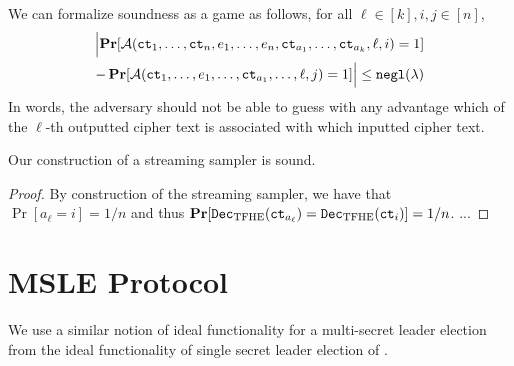We can formalize soundness as a game as follows, for all $\ell \in [k], i, j \in [n]$,
\begin{align}
	\Bigl\lvert 
		\operatorname*{\mathbf{Pr}}[\mathcal{A}(\texttt{ct}_1, \dots, \texttt{ct}_n, e_1, \dots, e_n, \texttt{ct}_{a_1}, \dots, \texttt{ct}_{a_k}, \ell, i) = 1] \\
		 - \operatorname*{\mathbf{Pr}}[\mathcal{A}(\texttt{ct}_1, \dots, e_1, \dots, \texttt{ct}_{a_1}, \dots, \ell, j) = 1]
	\Bigr\rvert \leq \texttt{negl}(\lambda) \notag
\end{align}
In words, the adversary should not be able to guess with any advantage which of the $\ell$-th 
outputted cipher text is associated with which inputted cipher text.

\begin{lemma}
	Our construction of a streaming sampler is sound.
	\begin{proof}
		By construction of the streaming sampler, we have that $\Pr[a_\ell = i] = 1/n$ and thus $\operatorname*{\mathbf{Pr}}[\texttt{Dec}_{\mathrm{TFHE}}(\texttt{ct}_{a_\ell}) = \texttt{Dec}_{\mathrm{TFHE}}(\texttt{ct}_i)] = 1/n$.
		...


	\end{proof}
\end{lemma}

\section{MSLE Protocol}
\label{sec:msle_protocol}
We use a similar notion of ideal functionality for a multi-secret leader election from the ideal
functionality of single secret leader election of .

